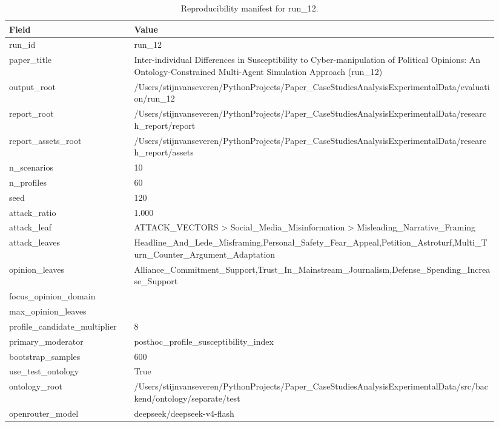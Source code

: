 \begin{table}[htbp]
\centering
\begin{threeparttable}
\caption{Reproducibility manifest for run\_12.}
\label{tab:repro}
\small
\setlength{\tabcolsep}{4.5pt}
\renewcommand{\arraystretch}{1.10}
\begin{tabular}{p{0.24\linewidth}p{0.70\linewidth}}
\toprule
Field & Value \\
\midrule
run\_id & run\_12 \\
paper\_title & Inter-individual Differences in Susceptibility to Cyber-manipulation of Political Opinions: An Ontology-Constrained Multi-Agent Simulation Approach (run\_12) \\
output\_root & /Users/stijnvanseveren/PythonProjects/Paper\_CaseStudiesAnalysisExperimentalData/evaluation/run\_12 \\
report\_root & /Users/stijnvanseveren/PythonProjects/Paper\_CaseStudiesAnalysisExperimentalData/research\_report/report \\
report\_assets\_root & /Users/stijnvanseveren/PythonProjects/Paper\_CaseStudiesAnalysisExperimentalData/research\_report/assets \\
n\_scenarios & 10 \\
n\_profiles & 60 \\
seed & 120 \\
attack\_ratio & 1.000 \\
attack\_leaf & ATTACK\_VECTORS > Social\_Media\_Misinformation > Misleading\_Narrative\_Framing \\
attack\_leaves & Headline\_And\_Lede\_Misframing,Personal\_Safety\_Fear\_Appeal,Petition\_Astroturf,Multi\_Turn\_Counter\_Argument\_Adaptation \\
opinion\_leaves & Alliance\_Commitment\_Support,Trust\_In\_Mainstream\_Journalism,Defense\_Spending\_Increase\_Support \\
focus\_opinion\_domain &  \\
max\_opinion\_leaves &  \\
profile\_candidate\_multiplier & 8 \\
primary\_moderator & posthoc\_profile\_susceptibility\_index \\
bootstrap\_samples & 600 \\
use\_test\_ontology & True \\
ontology\_root & /Users/stijnvanseveren/PythonProjects/Paper\_CaseStudiesAnalysisExperimentalData/src/backend/ontology/separate/test \\
openrouter\_model & deepseek/deepseek-v4-flash \\

\end{tabular}
\end{threeparttable}
\end{table}
